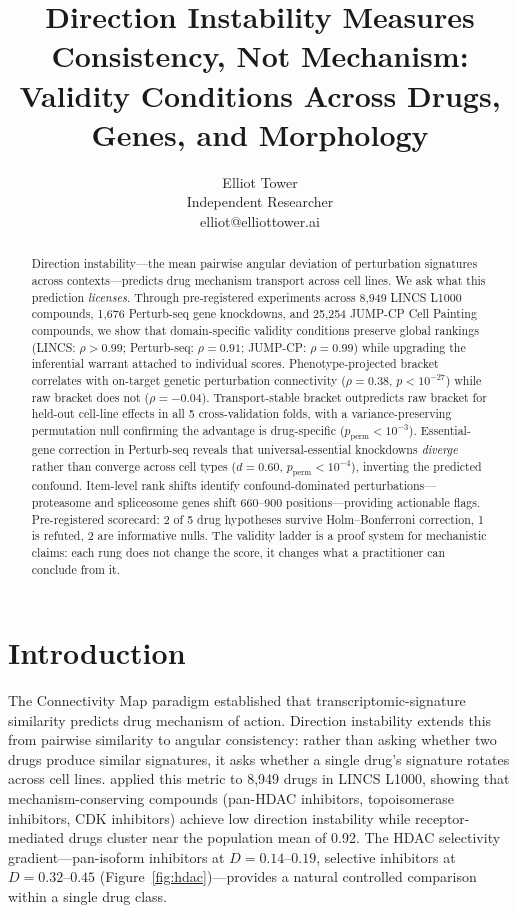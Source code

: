 \documentclass{article}
\title{Direction Instability Measures Consistency, Not Mechanism:\\ Validity Conditions Across Drugs, Genes, and Morphology}
\author{\name Elliot Tower \\
      \addr Independent Researcher \\
      \email elliot@elliottower.ai}
\begin{document}
\maketitle

\begin{abstract}
Direction instability---the mean pairwise angular deviation of perturbation
signatures across contexts---predicts drug mechanism transport across cell
lines. We ask what this prediction \emph{licenses}. Through pre-registered
experiments across 8{,}949 LINCS L1000 compounds, 1{,}676 Perturb-seq gene
knockdowns, and 25{,}254 JUMP-CP Cell Painting compounds, we show that
domain-specific validity conditions preserve global rankings (LINCS:
$\rho > 0.99$; Perturb-seq: $\rho = 0.91$; JUMP-CP: $\rho = 0.99$)
while upgrading the inferential warrant attached to individual scores.
Phenotype-projected bracket correlates with on-target genetic perturbation
connectivity ($\rho = 0.38$, $p < 10^{-27}$) while raw bracket does not
($\rho = -0.04$). Transport-stable bracket outpredicts raw bracket for
held-out cell-line effects in all 5 cross-validation folds, with a
variance-preserving permutation null confirming the advantage is
drug-specific ($p_{\text{perm}} < 10^{-3}$). Essential-gene correction
in Perturb-seq reveals that universal-essential knockdowns \emph{diverge}
rather than converge across cell types ($d = 0.60$,
$p_{\text{perm}} < 10^{-4}$), inverting the predicted confound. Item-level
rank shifts identify confound-dominated perturbations---proteasome and
spliceosome genes shift 660--900 positions---providing actionable flags.
Pre-registered scorecard: 2 of 5 drug hypotheses survive
Holm--Bonferroni correction, 1 is refuted, 2 are informative nulls.
The validity ladder is a proof system for mechanistic
claims: each rung does not change the score, it changes what a
practitioner can conclude from it.
\end{abstract}

\section{Introduction}

The Connectivity Map paradigm \citep{lamb2006connectivity,subramanian2017next}
established that transcriptomic-signature similarity predicts drug mechanism
of action. Direction instability extends this from pairwise similarity to
angular consistency: rather than asking whether two drugs produce similar
signatures, it asks whether a single drug's signature rotates across cell
lines. \citet{tower2026bracket} applied this metric to 8{,}949 drugs in
LINCS L1000, showing that mechanism-conserving compounds (pan-HDAC
inhibitors, topoisomerase inhibitors, CDK inhibitors) achieve low direction
instability while receptor-mediated drugs cluster near the population mean
of 0.92. The HDAC selectivity gradient---pan-isoform
inhibitors at $D = 0.14$--$0.19$, selective inhibitors at
$D = 0.32$--$0.45$ (Figure~\ref{fig:hdac})---provides a natural controlled
comparison within a single drug class.
\end{document}
